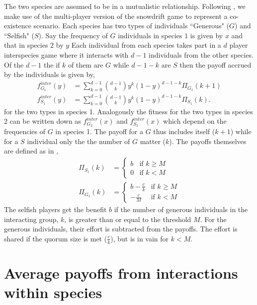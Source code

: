 \documentclass{pnastwo}
\begin{document}
\begin{article}
The two species are assumed to be in a mutualistic relationship.
Following \cite{bergstrom:PNAS:2003,souza:JTB:2009,gokhale:PRSB:2012}, we make use of the multi-player version of the snowdrift game to represent a co-existence scenario.
Each species has two types of individuals ``Generous" ($G$) and ``Selfish" ($S$).
Say the frequency of $G$ individuals in species $1$ is given by $x$ and that in species 2 by $y$
Each individual from each species takes part in a $d$ player interspecies game where it interacts with $d-1$ individuals from the other species.
Of the $d-1$ the if $k$ of them are $G$ while $d-1-k$ are $S$ then the payoff accrued by the individuals is given by,
%
\begin{align}
f^{inter}_{G_1} (y) &= \sum_{k=0}^{d-1} \binom{d-1}{k}y^k (1-y)^{d-1-k} \Pi_{G_1}(k+1) \\
f^{inter}_{S_1} (y) &= \sum_{k=0}^{d-1} \binom{d-1}{k}y^k (1-y)^{d-1-k} \Pi_{S_1}(k).
\label{interfiteqs}
\end{align}
%
for the two types in species 1.
Analogously the fitness for the two types in species 2 can be written down as $f^{inter}_{G_2} (x)$ and $f^{inter}_{S_2} (x)$ which depend on the frequencies of $G$ in species 1.
The payoff for a $G$ thus includes itself ($k+1$) while for a $S$ individual only the the number of $G$ matter ($k$).
The payoffs themselves are defined as in \cite{souza:JTB:2009},
%
\begin{align}
\Pi_{S_1} (k) & = \begin{cases} b & \textrm{if } k \geq M \\ 0 & \textrm{if } k < M \end{cases}
\\
\Pi_{G_1} (k) & = \begin{cases} b-\frac{c}{k} & \textrm{if } k \geq M \\  -\frac{c}{M} & \textrm{if } k < M \end{cases}
\end{align}
%
The selfish players get the benefit $b$ if the number of generous individuals in the interacting group, $k$, is greater than or equal to the threshold $M$.
For the generous individuals, their effort is subtracted from the payoffs.
The effort is shared if the quorum size is met ($\frac{c}{k}$), but is in vain for $k<M$.


\section*{Average payoffs from interactions within species}
\label{appB}


\end{article}
\end{document}
